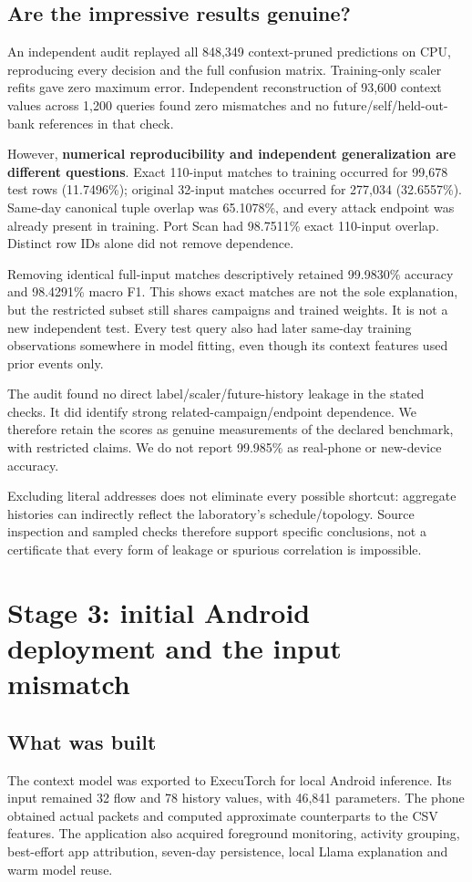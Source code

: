 \documentclass[11pt,a4paper,oneside]{report}
\begin{document}
\section{Are the impressive results genuine?}
An independent audit replayed all 848,349 context-pruned predictions on CPU, reproducing every decision and the full confusion matrix. Training-only scaler refits gave zero maximum error. Independent reconstruction of 93,600 context values across 1,200 queries found zero mismatches and no future/self/held-out-bank references in that check.

However, \textbf{numerical reproducibility and independent generalization are different questions}. Exact 110-input matches to training occurred for 99,678 test rows (11.7496\%); original 32-input matches occurred for 277,034 (32.6557\%). Same-day canonical tuple overlap was 65.1078\%, and every attack endpoint was already present in training. Port Scan had 98.7511\% exact 110-input overlap. Distinct row IDs alone did not remove dependence.

Removing identical full-input matches descriptively retained 99.9830\% accuracy and 98.4291\% macro F1. This shows exact matches are not the sole explanation, but the restricted subset still shares campaigns and trained weights. It is not a new independent test. Every test query also had later same-day training observations somewhere in model fitting, even though its context features used prior events only.

The audit found no direct label/scaler/future-history leakage in the stated checks. It did identify strong related-campaign/endpoint dependence. We therefore retain the scores as genuine measurements of the declared benchmark, with restricted claims. We do not report 99.985\% as real-phone or new-device accuracy.

Excluding literal addresses does not eliminate every possible shortcut: aggregate histories can indirectly reflect the laboratory's schedule/topology. Source inspection and sampled checks therefore support specific conclusions, not a certificate that every form of leakage or spurious correlation is impossible.

\chapter{Stage 3: initial Android deployment and the input mismatch}
\section{What was built}
The context model was exported to ExecuTorch for local Android inference. Its input remained 32 flow and 78 history values, with 46,841 parameters. The phone obtained actual packets and computed approximate counterparts to the CSV features. The application also acquired foreground monitoring, activity grouping, best-effort app attribution, seven-day persistence, local Llama explanation and warm model reuse.
\end{document}
